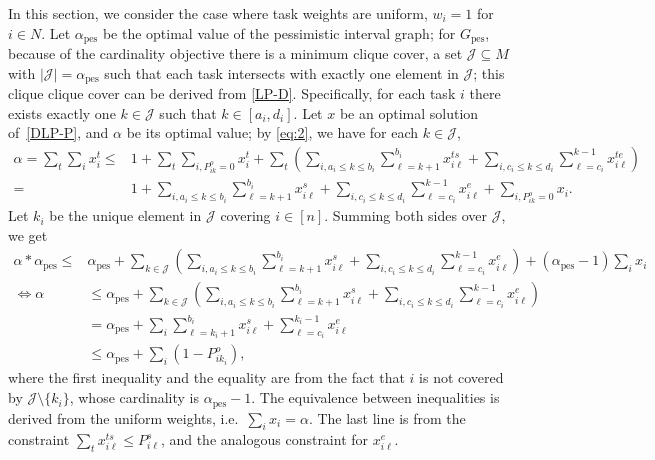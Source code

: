 \documentclass{article}
\DeclareMathOperator{\pes}{pes}
\begin{document}
In this section, we consider the case where task weights are uniform, $ w_i = 1 $ for $ i \in N$.
Let $\alpha_{\pes}$ be the optimal value of the pessimistic interval graph; 
for $G_\pes$, because of the cardinality objective there is a minimum clique cover, a set $\mathcal{J}\subseteq M$ with $ \lvert \mathcal{J} \rvert = \alpha_{\pes} $ such that each task intersects with exactly one element in $\mathcal{J}$; this clique clique cover can be derived from \eqref{LP-D}. 
Specifically, for each task $i$ there exists exactly one $k\in \mathcal{J}$ such that $k\in[a_i,d_i]$.
Let $x$ be an optimal solution of~\eqref{DLP-P}, and $\alpha$ be its optimal value;
by \eqref{eq:2}, we have for each $k\in\mathcal{J}$,
\begin{align*}
   \alpha = \sum_{t}\sum_{i} x_i^t \leq &1+\sum_{t}\sum_{i, P_{ik}^o = 0} x_i^t
   +\sum_t \left(\sum_{i,a_i\leq k\leq b_i}\sum_{\ell = k+1}^{b_i}x_{i\ell}^{ts}+\sum_{i,c_i\leq k\leq d_i}\sum_{\ell =c_i}^{k-1}x_{i\ell}^{te}\right)\\
   =& 1+\sum_{i,a_i\leq k\leq b_i}\sum_{\ell = k+1}^{b_i}x_{i\ell}^{s}+\sum_{i,c_i\leq k\leq d_i}\sum_{\ell =c_i}^{k-1}x_{i\ell}^{e}+\sum_{i, P_{ik}^o = 0} x_i.
\end{align*}
Let $k_i$ be the unique element in $\mathcal{J}$ covering $i\in[n]$.
Summing both sides over $\mathcal{J}$, we get
\begin{align*}
    \alpha*\alpha_{\pes}\leq  &\alpha_{\pes}+\sum_{k\in\mathcal{J}}\left(\sum_{i,a_i\leq k\leq b_i}\sum_{\ell = k+1}^{b_i}x_{i\ell}^{s}+\sum_{i,c_i\leq k\leq d_i}\sum_{\ell =c_i}^{k-1}x_{i\ell}^{e}\right)+(\alpha_{\pes}-1)\sum_{i}x_i\\
    \iff
    \alpha &\leq \alpha_{\pes}+\sum_{k\in\mathcal{J}}\left(\sum_{i,a_i\leq k\leq b_i}\sum_{\ell = k+1}^{b_i}x_{i\ell}^{s }+\sum_{i,c_i\leq k\leq d_i}\sum_{\ell =c_i}^{k-1}x_{i\ell}^{e}\right)\\
    &=\alpha_{\pes}+\sum_{i}\sum_{\ell=k_i+1}^{b_i}x_{i\ell}^{s}+\sum_{\ell=c_i}^{k_i-1}x_{i\ell}^{e}\\
    &\leq \alpha_{\pes}+\sum_i (1-P_{ik_i}^o) ,
\end{align*}
where the first inequality and the equality are from the fact that $i$ is not covered by $\mathcal{J}\setminus\{k_i\}$, whose cardinality is $\alpha_\pes-1$. 
The equivalence between inequalities is derived  from the uniform weights, i.e.\ $\sum_{i}x_i = \alpha$.
The last line is from the constraint $\sum_{t}x_{i\ell}^{ts}\leq P_{i\ell}^s$, and the analogous constraint for $x_{i\ell}^e$.
\end{document}
